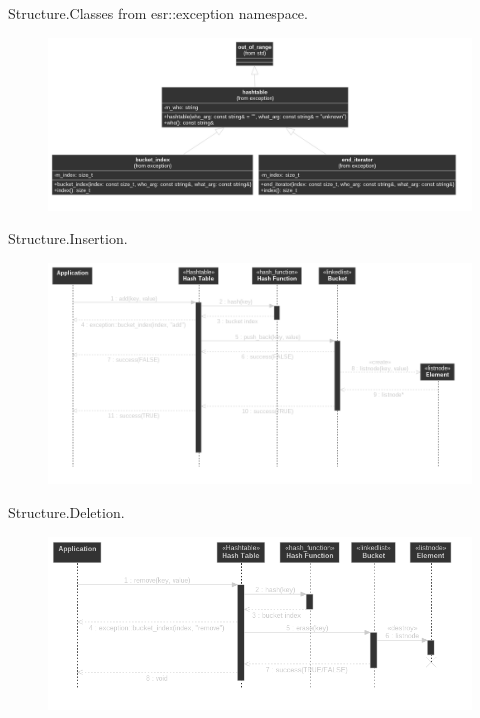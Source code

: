 \documentclass{beamer}
\begin{document}
\begin{frame}{Structure.}{Classes from esr::exception namespace.}
  \begin{figure}
    \includegraphics[scale=0.3]{pictures/structure_exceptions_classes}
  \end{figure}
\end{frame}


\begin{frame}{Structure.}{Insertion.}
  \begin{figure}
    \includegraphics[scale=0.3]{pictures/structure_insertion_sequence}
  \end{figure}
\end{frame}

\begin{frame}{Structure.}{Deletion.}
  \begin{figure}
    \includegraphics[scale=0.3]{pictures/structure_deletion_sequence}
  \end{figure}
\end{frame}
\end{document}
